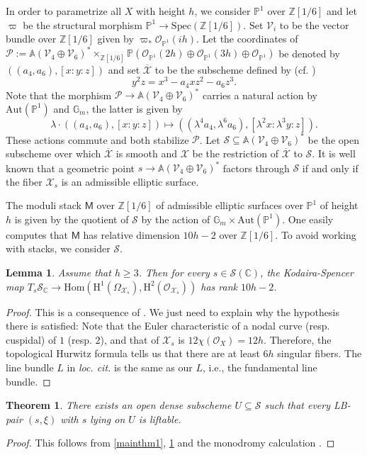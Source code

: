 \documentclass[letter, 11pt]{article}
\theoremstyle{plain}
\newtheorem{theorem}[subsubsection]{Theorem}
\newtheorem{lemma}[subsubsection]{Lemma}
\theoremstyle{definition}
\newcommand{\IA}{\mathbb{A}}
\newcommand{\IC}{\mathbb{C}}
\newcommand{\IG}{\mathbb{G}}
\newcommand{\IP}{\mathbb{P}}
\newcommand{\IZ}{\mathbb{Z}}
\newcommand{\Hom}{\mathrm{Hom}}
\newcommand{\Aut}{\mathrm{Aut}}
\newcommand{\Spec}{\mathrm{Spec}}
\newcommand{\<}{\langle}
\renewcommand{\>}{\rangle}
\newcommand{\sV}{\mathcal{V}}
\newcommand{\sX}{\mathcal{X}}
\newcommand{\sS}{\mathcal{S}}
\newcommand{\sO}{\mathcal{O}}
\newcommand{\sP}{\mathcal{P}}
\renewcommand{\H}{\mathrm{H}}
\newcommand{\sfM}{\mathsf{M}}
\begin{document}

In order to parametrize all $X$ with height $h$, we consider $\IP^1$ over $\IZ[1/6]$ and let $\varpi$ be the structural morphism $\IP^1 \to \Spec(\IZ[1/6])$. Set $\sV_i$ to be the vector bundle over $\IZ[1/6]$ given by $\varpi_* \sO_{\IP^1}(ih)$. Let the coordinates of $\sP := \IA(\sV_4 \oplus \sV_6)^* \times_{\IZ[1/6]} \IP(\sO_{\IP^1}(2h) \oplus \sO_{\IP^1}(3h) \oplus \sO_{\IP^1})$ be denoted by $( (a_4, a_6), [x : y : z])$ and set $\overline{\sX}$ to be the subscheme defined by (cf. \cite[Thm~1]{Kas})
$$ y^2 z = x^3 - a_4 xz^2 - a_6 z^3. $$
Note that the morphism $\sP \to \IA(\sV_4 \oplus \sV_6)^*$ carries a natural action by $\Aut(\IP^1)$ and $\IG_m$, the latter is given by $$ \lambda \cdot ((a_4, a_6), [x : y : z]) \mapsto ((\lambda^4 a_4, \lambda^6 a_6), [\lambda^2 x : \lambda^3 y : z]).  $$
These actions commute and both stabilize $\sP$. Let $\sS \subseteq \IA(\sV_4 \oplus \sV_6)^*$ be the open subscheme over which $\overline{\sX}$ is smooth and $\sX$ be the restriction of $\overline{\sX}$ to $\sS$.  It is well known that a geometric point $s \to \IA(\sV_4 \oplus \sV_6)^*$ factors through $\sS$ if and only if the fiber $\sX_s$ is an admissible elliptic surface. 

The moduli stack $\sfM$ over $\IZ[1/6]$ of admissible elliptic surfaces over $\IP^1$ of height $h$ is given by the quotient of $\sS$ by the action of $\IG_m \times \Aut(\IP^1)$. One easily computes that $\sfM$ has relative dimension $10 h - 2$ over $\IZ[1/6]$. To avoid working with stacks, we consider $\sS$. 

\begin{lemma}
\label{lem: Torelli for elliptic}
    Assume that $h \ge 3$. Then for every $s \in \sS(\IC)$, the Kodaira-Spencer map $T_s \sS_\IC \to \Hom(\H^1(\Omega_{\sX_s}), \H^2(\sO_{\sX_s}))$ has rank $10 h - 2$. 
\end{lemma}
\begin{proof}
    This is a consequence of \cite[Thm~2.10]{SB}. We just need to explain why the hypothesis there is satisfied: Note that the Euler characteristic of a nodal curve (resp. cuspidal) of $1$ (resp. $2$), and that of $\sX_s$ is $12 \chi(\sO_X) = 12 h$. Therefore, the topological Hurwitz formula tells us that there are at least $6h$ singular fibers. The line bundle $L$ in \textit{loc. cit.} is the same as our $L$, i.e., the fundamental line bundle. 
\end{proof}

\begin{theorem}
There exists an open dense subscheme $U \subseteq \sS$ such that every LB-pair $(s, \xi)$ with $s$ lying on $U$ is liftable. 
\end{theorem} 
\begin{proof}
    This follows from \ref{mainthm1}, \ref{lem: Torelli for elliptic} and the monodromy calculation \cite[Thm~4.10]{JF}. 
\end{proof}
\end{document}
